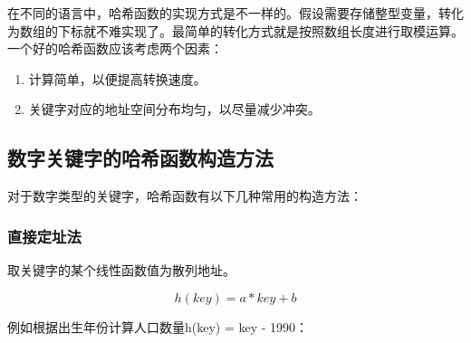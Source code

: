 在不同的语言中，哈希函数的实现方式是不一样的。假设需要存储整型变量，转化为数组的下标就不难实现了。最简单的转化方式就是按照数组长度进行取模运算。\\

一个好的哈希函数应该考虑两个因素：

\begin{enumerate}
	\item 计算简单，以便提高转换速度。
	\item 关键字对应的地址空间分布均匀，以尽量减少冲突。
\end{enumerate}

\vspace{0.5cm}

\subsection{数字关键字的哈希函数构造方法}

对于数字类型的关键字，哈希函数有以下几种常用的构造方法：

\subsubsection{直接定址法}

取关键字的某个线性函数值为散列地址。

\vspace{-0.5cm}

$$
	h(key) = a * key + b
$$

例如根据出生年份计算人口数量h(key) = key - 1990：

\begin{table}[H]
	\centering
	\caption{直接定址法}
\end{table}

